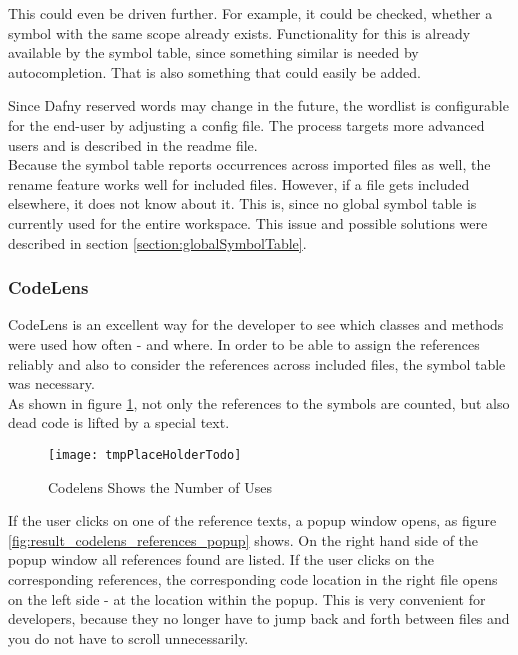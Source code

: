 This could even be driven further.
For example, it could be checked, whether a symbol with the same scope already exists.
Functionality for this is already available by the symbol table, since something similar is needed by autocompletion.
That is also something that could easily be added.

Since Dafny reserved words may change in the future, the wordlist is configurable for the end-user by adjusting a config file.
The process targets more advanced users and is described in the readme file.\\

Because the symbol table reports occurrences across imported files as well, the rename feature works well for included files.
However, if a file gets included elsewhere, it does not know about it.
This is, since no global symbol table is currently used for the entire workspace.
This issue and possible solutions were described in section \ref{section:globalSymbolTable}.\\

\subsubsection{CodeLens}
CodeLens is an excellent way for the developer to see which classes and methods were used how often - and where.
In order to be able to assign the references reliably and
also to consider the references across included files, the symbol table was necessary. \\

As shown in figure \ref{fig:result_codelens_references},
not only the references to the symbols are counted,
but also dead code is lifted by a special text.

\begin{figure}[H]
    \centering
    \texttt{[image: tmpPlaceHolderTodo]}
    \caption{Codelens Shows the Number of Uses}
    \label{fig:result_codelens_references}
\end{figure}

If the user clicks on one of the reference texts, a popup window opens,
as figure \ref{fig:result_codelens_references_popup} shows.
On the right hand side of the popup window all references found are listed.
If the user clicks on the corresponding references, the corresponding code
location in the right file opens on the left side - at the location within the popup.
This is very convenient for developers,
because they no longer have to jump back and forth between files and you do not have to scroll unnecessarily.

